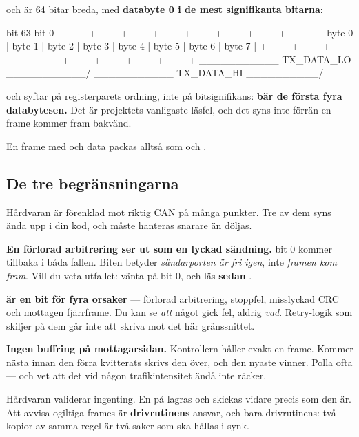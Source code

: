  och  är 64 bitar breda, med \textbf{databyte 0 i de mest signifikanta
bitarna}:

\begin{console}
bit 63                                                              bit 0
+--------+--------+--------+--------+--------+--------+--------+--------+
| byte 0 | byte 1 | byte 2 | byte 3 | byte 4 | byte 5 | byte 6 | byte 7 |
+--------+--------+--------+--------+--------+--------+--------+--------+
 \___________ TX_DATA_LO ___________/ \___________ TX_DATA_HI __________/
\end{console}

 och  syftar på registerparets ordning, inte på bitsignifikans:
\textbf{ bär de första fyra databytesen.} Det är projektets vanligaste läsfel,
och det syns inte förrän en frame kommer fram bakvänd.

En frame med  och data  packas alltså som 
och .

\subsection{De tre begränsningarna}
\label{sec:limits}

Hårdvaran är förenklad mot riktig CAN på många punkter. Tre av dem syns ända upp i din kod, och
måste hanteras snarare än döljas.

\begin{limitation}
\textbf{En förlorad arbitrering ser ut som en lyckad sändning.}  bit 0 kommer tillbaka
i båda fallen. Biten betyder \emph{sändarporten är fri igen}, inte \emph{framen kom fram}. Vill du
veta utfallet: vänta på bit 0, och läs \textbf{sedan} .
\end{limitation}

\begin{limitation}
\textbf{ är en bit för fyra orsaker} --- förlorad arbitrering, stoppfel,
misslyckad CRC och mottagen fjärrframe. Du kan se \emph{att} något gick fel, aldrig \emph{vad}.
Retry-logik som skiljer på dem går inte att skriva mot det här gränssnittet.
\end{limitation}

\begin{limitation}
\textbf{Ingen buffring på mottagarsidan.} Kontrollern håller exakt en frame. Kommer nästa innan
den förra kvitterats skrivs den över, och den nyaste vinner. Polla ofta --- och vet att det vid
någon trafikintensitet ändå inte räcker.
\end{limitation}

\begin{aside}
\note Hårdvaran validerar ingenting. En  på  lagras och skickas vidare
precis som den är. Att avvisa ogiltiga frames är \textbf{drivrutinens} ansvar, och bara
drivrutinens: två kopior av samma regel är två saker som ska hållas i synk.
\end{aside}
